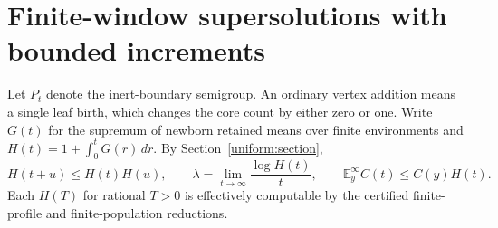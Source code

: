 \section{Finite-window supersolutions with bounded increments}
\label{sc:section}

Let $P_t$ denote the inert-boundary semigroup.  An ordinary vertex
addition means a single leaf birth, which changes the core count by
either zero or one.
Write $G(t)$ for the supremum of newborn retained means over finite
environments and $H(t)=1+\int_0^tG(r)\,dr$.  By Section~\ref{uniform:section},
\[
 H(t+u)\le H(t)H(u),\qquad
 \lambda=\lim_{t\to\infty}\frac{\log H(t)}t,
 \qquad \mathbb E_y^\infty C(t)\le C(y)H(t).
\]
Each $H(T)$ for rational $T>0$ is effectively computable by the certified
finite-profile and finite-population reductions.

